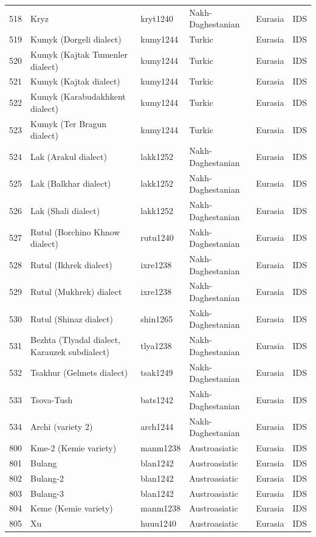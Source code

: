 \begin{table}[ht]
\begin{tabular}{rlllll}
  518 & Kryz & kryt1240 & Nakh-Daghestanian & Eurasia & IDS \\ 
  519 & Kumyk (Dorgeli dialect) & kumy1244 & Turkic & Eurasia & IDS \\ 
  520 & Kumyk (Kajtak Tumenler dialect) & kumy1244 & Turkic & Eurasia & IDS \\ 
  521 & Kumyk (Kajtak dialect) & kumy1244 & Turkic & Eurasia & IDS \\ 
  522 & Kumyk (Karabudakhkent dialect) & kumy1244 & Turkic & Eurasia & IDS \\ 
  523 & Kumyk (Ter Bragun dialect) & kumy1244 & Turkic & Eurasia & IDS \\ 
  524 & Lak (Arakul dialect) & lakk1252 & Nakh-Daghestanian & Eurasia & IDS \\ 
  525 & Lak (Balkhar dialect) & lakk1252 & Nakh-Daghestanian & Eurasia & IDS \\ 
  526 & Lak (Shali dialect) & lakk1252 & Nakh-Daghestanian & Eurasia & IDS \\ 
  527 & Rutul (Borchino Khnow dialect) & rutu1240 & Nakh-Daghestanian & Eurasia & IDS \\ 
  528 & Rutul (Ikhrek dialect) & ixre1238 & Nakh-Daghestanian & Eurasia & IDS \\ 
  529 & Rutul (Mukhrek) dialect & ixre1238 & Nakh-Daghestanian & Eurasia & IDS \\ 
  530 & Rutul (Shinaz dialect) & shin1265 & Nakh-Daghestanian & Eurasia & IDS \\ 
  531 & Bezhta (Tlyadal dialect, Karauzek subdialect) & tlya1238 & Nakh-Daghestanian & Eurasia & IDS \\ 
  532 & Tsakhur (Gelmets dialect) & tsak1249 & Nakh-Daghestanian & Eurasia & IDS \\ 
  533 & Tsova-Tush & bats1242 & Nakh-Daghestanian & Eurasia & IDS \\ 
  534 & Archi (variety 2) & arch1244 & Nakh-Daghestanian & Eurasia & IDS \\ 
  800 & Kme-2 (Kemie variety) & manm1238 & Austroasiatic & Eurasia & IDS \\ 
  801 & Bulang & blan1242 & Austroasiatic & Eurasia & IDS \\ 
  802 & Bulang-2 & blan1242 & Austroasiatic & Eurasia & IDS \\ 
  803 & Bulang-3 & blan1242 & Austroasiatic & Eurasia & IDS \\ 
  804 & Keme (Kemie variety) & manm1238 & Austroasiatic & Eurasia & IDS \\ 
  805 & Xu & huuu1240 & Austroasiatic & Eurasia & IDS \\ 

\end{tabular}
\end{table}
